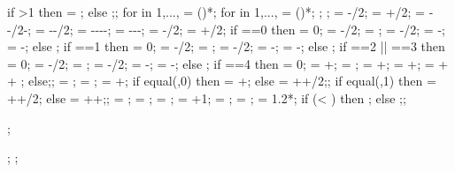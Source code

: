 {{if \nbays>1 then {\ncolmo = ;} else {;};
for \iii in {1,...,{\nlev}}{
\y{\iii} = ()*\storyheight;
for \jjj in {1,...,{\ncol}}{
\x{\jjj} = ()*\baywidth;
};
};
\rigbasestartx = -\baseslabw/2;
\rigbaseendx = \x{\ncol}+\baseslabw/2;
\isoboty = -\baseslabh-\baselinet/2-\isot;
\isotopy = -\baseslabh-\baselinet/2;
\foundboty = -\baseslabh-\baselinet-\isot-\foundt;
\foundtopy = -\baseslabh-\baselinet-\isot;
\foundstartx = -\foundationw/2;
\foundendx = \x{\ncol}+\foundationw/2;
if \showss==0 then {\grdofarrstartx = 0;
\grdofarrstarty = -\suph/2;
\grdofarrendx = \foundationdrift;
\grdofarrendy = -\suph/2;
\grdoftickboty = -;
\grdofticktopy = -;} else {};
if \showss==1 then {\grdofarrstartx = 0;
\grdofarrstarty = -\suph/2;
\grdofarrendx = \foundationdrift;
\grdofarrendy = -\suph/2;
\grdoftickboty = -;
\grdofticktopy = -;} else {};
if \showss==2 || \showss==3   then {\grdofarrstartx = 0;
\grdofarrstarty = -\baseslabh/2;
\grdofarrendx = \foundationdrift;
\grdofarrendy = -\baseslabh/2;
\grdoftickboty = -;
\grdofticktopy = -;} else {};
if \showss==4 then {\grdofarrstartx = 0;
\grdofarrstarty = \foundboty+;
\grdofarrendx = \foundationdrift;
\grdofarrendy = \foundboty+;
\grdoftickboty = \foundboty+;
\grdofticktopy = \foundboty+ + ;}
else{;};
\Xaxesstarty = ;
\Yaxesstartx = ;
\Yaxesstarty = \y{\nlev}+\axissp;
if equal(\showss,0) then {\Xaxesstartx = \x{\ncol}+\axissp;}         else {\Xaxesstartx = \x{\ncol}+\axissp+\supw/2;};
if equal(\showss,1) then {\Xaxesstartx = \x{\ncol}+\axissp+\supw/2;} else {\Xaxesstartx = \x{\ncol}+\axissp+\supw;};
\driftdist = \driftdist;
\driftcurvy = \driftcurveratioy*\storyheight;
\driftcurvx = \driftcurveratiox*\driftdist;
\doftextfloor = \doftextstory+1;
\vertrefstart = \vertreflineratio*\driftcurvy;
\storydofshift = \vertreflineratio*\driftcurvy;
\tempmasslimit = 1.2*\massrad;
if (\foundationdrift < \tempmasslimit) then {;} else {;};
}%

\begin{scope}[x=1pt, y=1pt, xshift=\startx, yshift=\starty, rotate=0]; %

;
;



\end{scope}}

